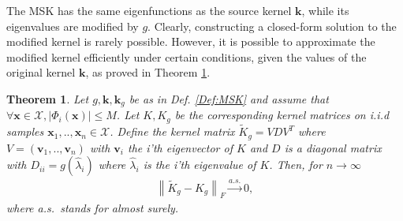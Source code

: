 \documentclass[10pt]{article} %
\theoremstyle{plain}
\newtheorem{theorem}{Theorem}[section]
\theoremstyle{definition}
\theoremstyle{remark}
\newcommand{\norm}[1]{\left\lVert#1\right\rVert}
\newcommand{\abs}[1]{\left|#1\right|}
\newcommand{\vv}{\mathbf{v}}
\newcommand{\x}{\mathbf{x}}
\newcommand{\kr}{\boldsymbol{k}}
\begin{document}
The MSK has the same eigenfunctions as the source kernel $\kr$, while its eigenvalues are modified by $g$. Clearly, constructing a closed-form solution to the modified kernel is rarely possible. However, it is possible to approximate the modified kernel efficiently under certain conditions, given the values of the original kernel $\kr$, as proved in Theorem \ref{thm:norm_conv}.


\begin{theorem}\label{thm:norm_conv}
Let $g, \kr, \kr_g$ be as in Def. \eqref{Def:MSK} and assume that $\forall \x\in \mathcal X,\abs{\Phi_i(\x)}\leq M$. Let $K,K_g$ be the corresponding kernel matrices on i.i.d samples $\x_1,..,\x_n\in \mathcal X$. Define the kernel matrix $\tilde K_g=V  D V^T$ where $V=(\vv_1,..,\vv_n)$ with $\vv_i$ the i'th eigenvector of $K$ and $ D$ is a diagonal matrix with $ D_{ii}=g(\hat \lambda_i)$ where $\hat \lambda_i$ is the i'th eigenvalue of $K$. Then, for $n\rightarrow \infty $
\begin{align*}
\norm{\tilde K_g-K_g}_F\overset{a.s.}{\rightarrow} 0,
\end{align*}
where a.s.\ stands for almost surely.
\end{theorem}
\end{document}
